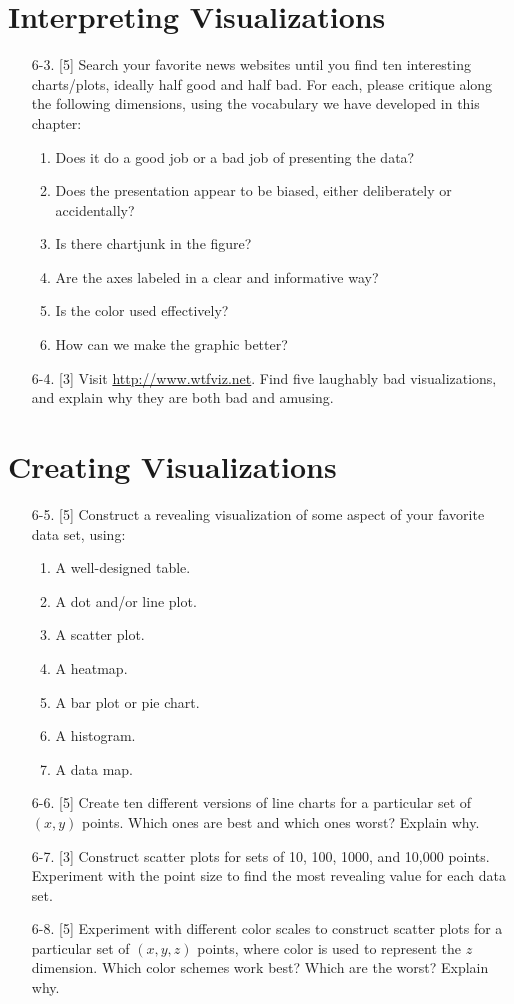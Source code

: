 \documentclass[10pt]{article}
\begin{document}
\section{Interpreting Visualizations}
\begin{enumerate}
  \item[6-3.] [5] Search your favorite news websites until you find ten interesting charts/plots, ideally half good and half bad. For each, please critique along the following dimensions, using the vocabulary we have developed in this chapter:
    \begin{enumerate}[label=(\alph*)]
      \item Does it do a good job or a bad job of presenting the data?
      \item Does the presentation appear to be biased, either deliberately or accidentally?
      \item Is there chartjunk in the figure?
      \item Are the axes labeled in a clear and informative way?
      \item Is the color used effectively?
      \item How can we make the graphic better?
    \end{enumerate}
  \item[6-4.] [3] Visit \url{http://www.wtfviz.net}. Find five laughably bad visualizations, and explain why they are both bad and amusing.
\end{enumerate}

\section{Creating Visualizations}
\begin{enumerate}
  \item[6-5.] [5] Construct a revealing visualization of some aspect of your favorite data set, using:
    \begin{enumerate}[label=(\alph*)]
      \item A well-designed table.
      \item A dot and/or line plot.
      \item A scatter plot.
      \item A heatmap.
      \item A bar plot or pie chart.
      \item A histogram.
      \item A data map.
    \end{enumerate}
  \item[6-6.] [5] Create ten different versions of line charts for a particular set of $(x, y)$ points. Which ones are best and which ones worst? Explain why.
  \item[6-7.] [3] Construct scatter plots for sets of 10, 100, 1000, and 10,000 points. Experiment with the point size to find the most revealing value for each data set.
  \item[6-8.] [5] Experiment with different color scales to construct scatter plots for a particular set of $(x, y, z)$ points, where color is used to represent the $z$ dimension. Which color schemes work best? Which are the worst? Explain why.
\end{enumerate}
\end{document}
